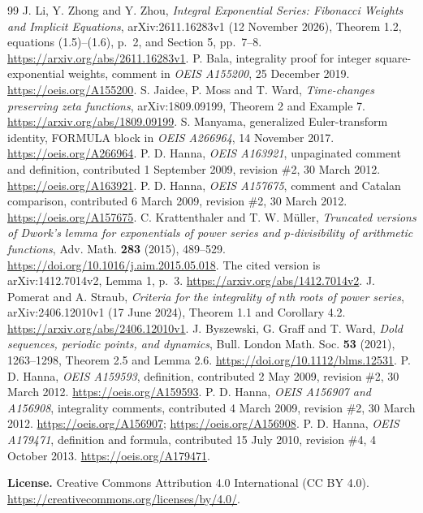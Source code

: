 \documentclass[11pt]{article}
\begin{document}
\begin{thebibliography}{99}
 J. Li, Y. Zhong and Y. Zhou,
\emph{Integral Exponential Series: Fibonacci Weights and Implicit Equations},
arXiv:2611.16283v1 (12 November 2026), Theorem 1.2,
equations (1.5)--(1.6), p.~2, and Section 5, pp.~7--8.
\url{https://arxiv.org/abs/2611.16283v1}.
 P. Bala, integrality proof for integer square-exponential
weights, comment in \emph{OEIS A155200}, 25 December 2019.
\url{https://oeis.org/A155200}.
 S. Jaidee, P. Moss and T. Ward,
\emph{Time-changes preserving zeta functions}, arXiv:1809.09199,
Theorem 2 and Example 7.
\url{https://arxiv.org/abs/1809.09199}.
 S. Manyama, generalized Euler-transform identity,
FORMULA block in \emph{OEIS A266964}, 14 November 2017.
\url{https://oeis.org/A266964}.
 P. D. Hanna, \emph{OEIS A163921}, unpaginated comment and
definition, contributed 1 September 2009, revision \#2, 30 March 2012.
\url{https://oeis.org/A163921}.
 P. D. Hanna, \emph{OEIS A157675}, comment and Catalan
comparison, contributed 6 March 2009, revision \#2, 30 March 2012.
\url{https://oeis.org/A157675}.
 C. Krattenthaler and T. W. M\"uller,
\emph{Truncated versions of Dwork's lemma for exponentials of power series
and $p$-divisibility of arithmetic functions}, Adv. Math. \textbf{283} (2015),
489--529. \url{https://doi.org/10.1016/j.aim.2015.05.018}.
The cited version is arXiv:1412.7014v2, Lemma 1, p.~3.
\url{https://arxiv.org/abs/1412.7014v2}.
 J. Pomerat and A. Straub,
\emph{Criteria for the integrality of $n$th roots of power series},
arXiv:2406.12010v1 (17 June 2024), Theorem 1.1 and Corollary 4.2.
\url{https://arxiv.org/abs/2406.12010v1}.
 J. Byszewski, G. Graff and T. Ward,
\emph{Dold sequences, periodic points, and dynamics},
Bull. London Math. Soc. \textbf{53} (2021), 1263--1298,
Theorem 2.5 and Lemma 2.6. \url{https://doi.org/10.1112/blms.12531}.
 P. D. Hanna, \emph{OEIS A159593}, definition,
contributed 2 May 2009, revision \#2, 30 March 2012.
\url{https://oeis.org/A159593}.
 P. D. Hanna, \emph{OEIS A156907 and A156908},
integrality comments, contributed 4 March 2009, revision \#2, 30 March 2012.
\url{https://oeis.org/A156907}; \url{https://oeis.org/A156908}.
 P. D. Hanna, \emph{OEIS A179471}, definition and formula,
contributed 15 July 2010, revision \#4, 4 October 2013.
\url{https://oeis.org/A179471}.
\end{thebibliography}
\noindent\small\textbf{License.} Creative Commons Attribution 4.0 International
(CC BY 4.0). \url{https://creativecommons.org/licenses/by/4.0/}.
\end{document}
